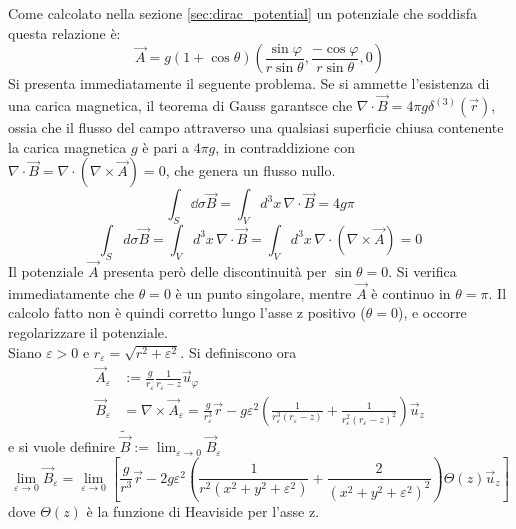 Come calcolato nella sezione \ref{sec:dirac_potential} un potenziale che soddisfa
questa relazione è:
\begin{equation}\label{eq:diracpotential}
  \vec A = g(1 + \cos\theta)\left( \frac{\sin\varphi}{r\sin\theta},
     \frac{-\cos\varphi}{r\sin\theta},0 \right)
\end{equation}
Si presenta immediatamente il seguente problema. Se si ammette l'esistenza di una carica
magnetica, il teorema di Gauss garantsce che $\nabla \cdot \vec B = 4\pi g\delta^{(3)}(\vec r)$,
ossia che il flusso del campo attraverso una qualsiasi superficie chiusa contenente
la carica magnetica $g$ è pari a $4\pi g$, in contraddizione con
$\nabla \cdot \vec B = \nabla \cdot (\nabla \times \vec A) = 0$, che genera un
flusso nullo.
\begin{equation}\label{eq:B4gpi}
   \int_S \dd\sigma \vec B = \int_V d^3 x \, \nabla \cdot \vec B = 4g\pi
\end{equation}
\begin{equation}
   \int_S d\sigma  \vec B = \int_V d^3 x \, \nabla \cdot \vec B
      = \int_V d^3 x \, \nabla \cdot (\nabla \times \vec A) = 0
\end{equation}
Il potenziale $\vec A$ presenta però delle discontinuità per $\sin\theta = 0$.
Si verifica immediatamente che $\theta = 0$ è un punto singolare, mentre $\vec A$
è continuo in $\theta = \pi$. Il calcolo fatto non è quindi corretto lungo l'asse z
positivo ($\theta = 0$), e occorre regolarizzare il potenziale.\\
Siano $\varepsilon > 0$  e $r_\varepsilon = \sqrt{r^2 + \varepsilon^2}$. Si definiscono ora
%
\begin{align*}
   \vec A_\varepsilon &:= \frac{g}{r_\varepsilon}\frac{1}{r_\varepsilon - z} \vec u _\varphi  \\
   \vec B _\varepsilon & = \nabla \times \vec A_\varepsilon = \frac{g}{r_\varepsilon^3}\vec r
      - g\varepsilon^2 \left( \frac{1}{r_\varepsilon^3(r_\varepsilon - z)}
         + \frac{1}{r_\varepsilon^2(r_\varepsilon-z)^2} \right)\vec u _z
\end{align*}
%
e si vuole definire $\tilde{\vec B} := \lim_{\varepsilon \to 0} \vec B _\varepsilon$
$$
   \lim_{\varepsilon \to 0} \vec B_\varepsilon = \lim_{\varepsilon \to 0} \left[
      \frac{g}{r^3}\vec r - 2g\varepsilon^2 \left( \frac{1}{r^2(x^2 + y^2 + \varepsilon^2)}
            + \frac{2}{(x^2 + y^2 + \varepsilon^2)^2} \right) \Theta(z) \vec u _z \right]
$$
dove $\Theta(z)$ è la funzione di Heaviside per l'asse z.\\
